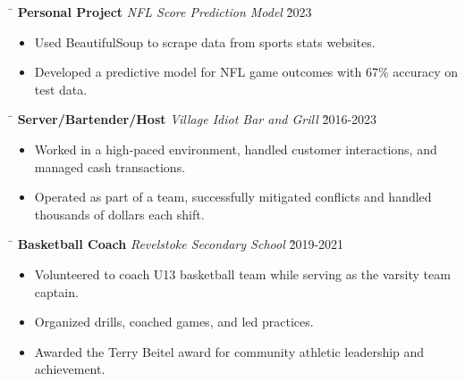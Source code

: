 \documentclass[a4paper,11pt]{article}
\def\locationh{\hspace{7cm}}
\def\subsectionv{\vspace{-5.3ex}}
\def\postpointsv{\vspace{0cm}}
\def\betweenjobsv{\vspace{0.4cm}}
\begin{document}
\betweenjobsv

\begin{tabbing}
    \locationh \= \kill
    \textbf{Personal Project} \> \textit{NFL Score Prediction Model} \` 2023 \\
\end{tabbing}

\begin{itemize}[leftmargin=.5cm, itemsep=.1cm, before=\subsectionv, after=\postpointsv]
    \item Used BeautifulSoup to scrape data from sports stats websites.
    \item Developed a predictive model for NFL game outcomes with 67\% accuracy on test data.
\end{itemize}

\betweenjobsv

\begin{tabbing}
    \locationh \= \kill
    \textbf{Server/Bartender/Host} \> \textit{Village Idiot Bar and Grill} \` 2016-2023 \\
\end{tabbing}

\begin{itemize}[leftmargin=.5cm, itemsep=.1cm, before=\subsectionv, after=\postpointsv]
    \item Worked in a high-paced environment, handled customer interactions, and managed cash transactions.
    \item Operated as part of a team, successfully mitigated conflicts and handled thousands of dollars each shift.
\end{itemize}

\betweenjobsv

\begin{tabbing}
    \locationh \= \kill
    \textbf{Basketball Coach} \> \textit{Revelstoke Secondary School} \` 2019-2021\\
\end{tabbing}

\begin{itemize}[leftmargin=.5cm, itemsep=.1cm, before=\subsectionv, after=\postpointsv]
    \item Volunteered to coach U13 basketball team while serving as the varsity team captain.
    \item Organized drills, coached games, and led practices.
    \item Awarded the Terry Beitel award for community athletic leadership and achievement.
\end{itemize}
\end{document}
